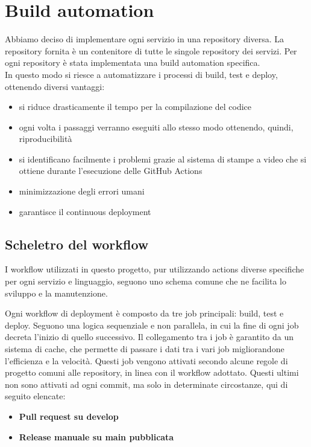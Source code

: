 \section{Build automation}
Abbiamo deciso di implementare ogni servizio in una repository diversa. La repository fornita è un contenitore di tutte le singole repository dei servizi.
Per ogni repository è stata implementata una build automation specifica. \\
In questo modo si riesce a automatizzare i processi di build, test e deploy, ottenendo diversi vantaggi:
\begin{itemize}
    \item si riduce drasticamente il tempo per la compilazione del codice
    \item ogni volta i passaggi verranno eseguiti allo stesso modo ottenendo, quindi, riproducibilità
    \item si identificano facilmente i problemi grazie al sistema di stampe a video che si ottiene durante l'esecuzione delle GitHub Actions
    \item minimizzazione degli errori umani
    \item garantisce il continuous deployment 
\end{itemize}

\subsection{Scheletro del workflow} 

I workflow utilizzati in questo progetto, pur utilizzando actions diverse specifiche per ogni servizio e linguaggio, seguono uno schema comune che ne facilita lo sviluppo e la manutenzione.

\vspace{0.5cm}

Ogni workflow di deployment è composto da tre job principali: build, test e deploy. Seguono una logica sequenziale e non parallela, in cui la fine di ogni job decreta l'inizio di quello successivo. Il collegamento tra i job è garantito da un sistema di cache, che permette di passare i dati tra i vari job migliorandone l'efficienza e la velocità.
Questi job vengono attivati secondo alcune regole di progetto comuni alle repository, in linea con il workflow adottato. Questi ultimi non sono attivati ad ogni commit, ma solo in determinate circostanze, qui di seguito elencate:
\begin{itemize}
    \item \textbf{Pull request su develop} 
    \item \textbf{Release manuale su main pubblicata}
\end{itemize}

